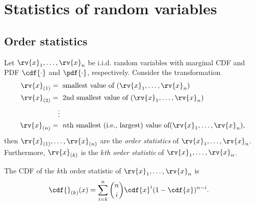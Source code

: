 \section{Statistics of random variables}
\subsection{Order statistics}
\begin{mydefinition}
    Let $\rv{x}_{1},\ldots,\rv{x}_{n}$ be i.i.d. random variables with marginal CDF and PDF $\cdf{\cdot}$ and $\pdf{\cdot}$, respectively. Consider the transformation
    \begin{align}
        \rv{x}_{(1)}&= \text{ smallest value of } (\rv{x}_{1},\ldots,\rv{x}_{n})\\
        \rv{x}_{(2)}&= \text{ 2nd smallest value of } (\rv{x}_{1},\ldots,\rv{x}_{n})\\
        &\quad\vdots\\
        \rv{x}_{(n)}&= \text{ $n$th smallest (i.e., largest) value of} (\rv{x}_{1},\ldots,\rv{x}_{n}),
    \end{align}
    then $\rv{x}_{(1)},\ldots,\rv{x}_{(n)}$ are the \emph{order statistics} of $\rv{x}_{1},\ldots,\rv{x}_{n}$. Furthermore, $\rv{x}_{(k)}$ is the \emph{$k$th order statistic} of $\rv{x}_{1},\ldots,\rv{x}_{n}$.
\end{mydefinition}

\begin{mytheorem}
    The CDF of the $k$th order statistic of $\rv{x}_{1},\ldots,\rv{x}_{n}$ is
    \begin{align}
        \cdf{}_{(k)}(x) &= \sum_{i=k}^{n} {n\choose i} \cdf{x}^{i}(1-\cdf{x})^{n-i}.
    \end{align}
\end{mytheorem}
